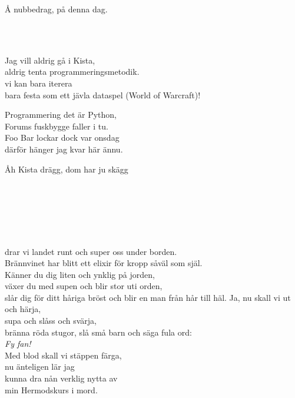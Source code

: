 \leftrepeat Å nubbedrag, på denna dag. \rightrepeat

 \\

\newpage
 \\       

\songtext{}
Jag vill aldrig gå i Kista,\\
aldrig tenta programmeringsmetodik.\\
vi kan bara iterera\\
bara festa som ett jävla dataspel (World of Warcraft)!

Programmering det är Python, \\
Forums fuskbygge faller i tu.\\
Foo Bar lockar dock var onsdag \\
därför hänger jag kvar här ännu.

\leftrepeat Åh Kista drägg, dom har ju skägg \rightrepeat

 \\\


 \\       
\author{Text: Hans Alfredson}

\\
drar vi landet runt och super oss under borden.\\
Brännvinet har blitt ett elixir för kropp såväl som själ.\\
Känner du dig liten och ynklig på jorden,\\
växer du med supen och blir stor uti orden,\\
slår dig för ditt håriga bröst och blir en man från hår till häl.
\newpage
Ja, nu skall vi ut och härja,\\
supa och slåss och svärja,\\
bränna röda stugor, slå små barn och säga fula ord:\\
\textit{Fy fan!}\\
Med blod skall vi stäppen färga,\\ 
nu änteligen lär jag\\ 
kunna dra nån verklig nytta av\\ 
min Hermodskurs i mord.

